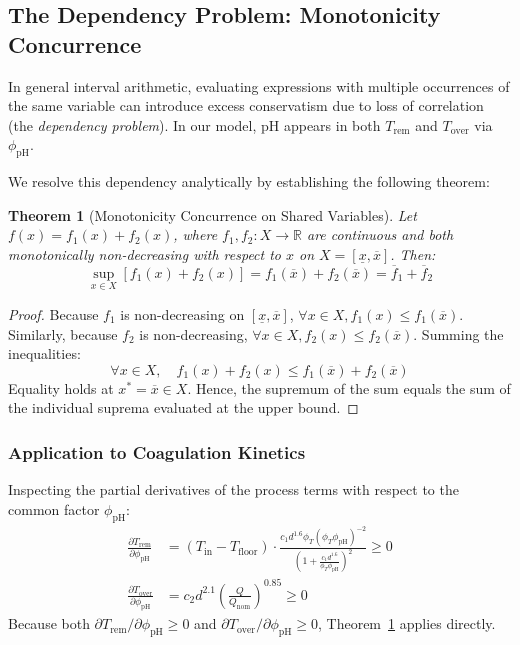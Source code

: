 \documentclass[10pt,twocolumn,letterpaper]{article}
\newtheorem{theorem}{Theorem}
\theoremstyle{definition}
\newcommand{\R}{\mathbb{R}}
\newcommand{\Trem}{T_{\text{rem}}}
\newcommand{\Tover}{T_{\text{over}}}
\newcommand{\Tin}{T_{\text{in}}}
\newcommand{\Tfloor}{T_{\text{floor}}}
\newcommand{\Qnom}{Q_{\text{nom}}}
\newcommand{\phipH}{\phi_{\text{pH}}}
\newcommand{\phiT}{\phi_T}
\begin{document}
\subsection{The Dependency Problem: Monotonicity Concurrence}
In general interval arithmetic, evaluating expressions with multiple occurrences of the same variable can introduce excess conservatism due to loss of correlation (the \textit{dependency problem}). In our model, $\text{pH}$ appears in both $\Trem$ and $\Tover$ via $\phipH$. 

We resolve this dependency analytically by establishing the following theorem:

\begin{theorem}[Monotonicity Concurrence on Shared Variables]
\label{thm:concurrence}
Let $f(x) = f_1(x) + f_2(x)$, where $f_1, f_2: X \to \R$ are continuous and both monotonically non-decreasing with respect to $x$ on $X = [\underline{x}, \overline{x}]$. Then:
\begin{equation}
\sup_{x \in X} [f_1(x) + f_2(x)] = f_1(\overline{x}) + f_2(\overline{x}) = \overline{f}_1 + \overline{f}_2
\end{equation}
\end{theorem}
\begin{proof}
Because $f_1$ is non-decreasing on $[\underline{x}, \overline{x}]$, $\forall x \in X, f_1(x) \le f_1(\overline{x})$. Similarly, because $f_2$ is non-decreasing, $\forall x \in X, f_2(x) \le f_2(\overline{x})$. Summing the inequalities:
\begin{equation}
\forall x \in X, \quad f_1(x) + f_2(x) \le f_1(\overline{x}) + f_2(\overline{x})
\end{equation}
Equality holds at $x^* = \overline{x} \in X$. Hence, the supremum of the sum equals the sum of the individual suprema evaluated at the upper bound.
\end{proof}

\subsubsection{Application to Coagulation Kinetics}
Inspecting the partial derivatives of the process terms with respect to the common factor $\phipH$:
\begin{align}
\frac{\partial \Trem}{\partial \phipH} &= (\Tin - \Tfloor) \cdot \frac{c_1 d^{1.6} \phiT (\phiT \phipH)^{-2}}{\left(1 + \frac{c_1 d^{1.6}}{\phiT \phipH}\right)^2} \ge 0 \\
\frac{\partial \Tover}{\partial \phipH} &= c_2 d^{2.1} \left(\frac{Q}{\Qnom}\right)^{0.85} \ge 0
\end{align}
Because both $\partial \Trem / \partial \phipH \ge 0$ and $\partial \Tover / \partial \phipH \ge 0$, Theorem~\ref{thm:concurrence} applies directly. 
\end{document}
